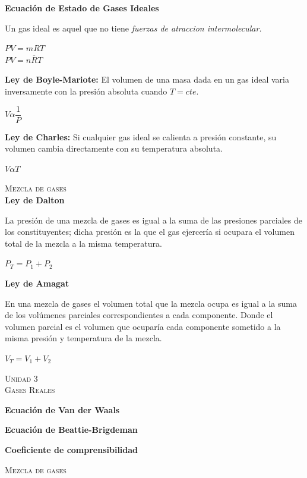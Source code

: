 \documentclass[11pt,a4paper,twocolumn]{article}
\newcommand{\unidad}[2]{\begin{center}
		\fontsize{10}{10}\selectfont\color{gray!50!black}\scshape Unidad #1 \\
		\fontsize{14}{14}\selectfont \scshape #2
\end{center}}
\begin{document}
	\textbf{Ecuación de Estado de Gases Ideales}
	
	Un gas ideal es aquel que no tiene \emph{fuerzas de atraccion intermolecular.}
	\begin{center}
		\textbf{$PV=mRT$}\\
		\textbf{$PV = n\overline{R}T$}
	\end{center}

	\textbf{Ley de Boyle-Mariote: } El volumen de una masa dada en un gas ideal varia inversamente con la presión absoluta cuando $T=cte$.
\begin{center}
	$V \alpha \dfrac{1}{P}$\\
\end{center}
	
	\textbf{Ley de Charles: } Si cualquier gas ideal se calienta a presión constante, su volumen cambia directamente con su temperatura absoluta. \begin{center}
		$V \alpha T$
	\end{center}
	\newpage

		\textsc{Mezcla de gases}\\
		
		
	\textbf{Ley de Dalton }
	
	La presión de una mezcla de gases es igual a la suma de las presiones parciales de los constituyentes; dicha presión es la que el gas ejercería si ocupara el volumen total de la mezcla a la misma temperatura.\begin{center}
		$P_{T}=P_{1}+P_{2}$
	\end{center}
	
	\textbf{Ley de Amagat }
	
	En una mezcla de gases el volumen total que la mezcla ocupa es igual a la suma de los volúmenes parciales correspondientes a cada componente. Donde el volumen parcial es el volumen que ocuparía cada componente sometido a la misma presión y temperatura de la mezcla. \begin{center}
		$V_{T}=V_{1}+V_{2}$
	\end{center}
		

	\unidad{3}{Gases Reales}
	
	\textbf{Ecuación de Van der Waals}
	
	\textbf{Ecuación de Beattie-Brigdeman}
	
	\textbf{Coeficiente de comprensibilidad}
	
	\textsc{Mezcla de gases}\\
\end{document}
